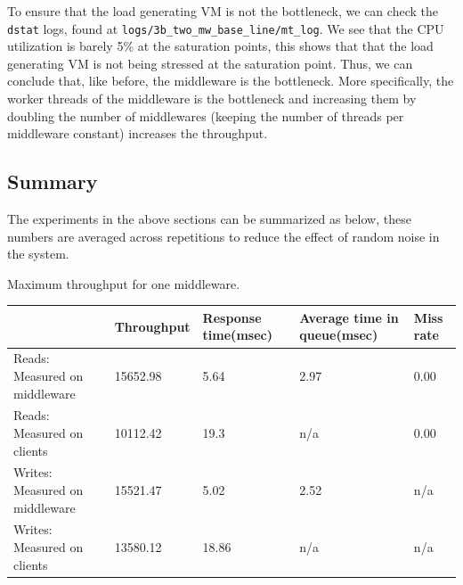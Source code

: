 \documentclass[11pt,a4paper]{article}
\newcommand\instructions[1]{\textcolor{blue}{Instructions: #1}}
\begin{document}
To ensure that the load generating VM is not the bottleneck, we can check the \texttt{dstat} logs, found at \texttt{logs/3b\_two\_mw\_base\_line/mt\_log}. We see that the CPU utilization is barely 5\% at the saturation points, this shows that that the load generating VM is not being stressed at the saturation point. Thus, we can conclude that, like before, the middleware is the bottleneck. More specifically, the worker threads of the middleware is the bottleneck and increasing them by doubling the number of middlewares (keeping the number of threads per middleware constant) increases the throughput.

\subsection{Summary}

The experiments in the above sections can be summarized as below, these numbers are averaged across repetitions to reduce the effect of random noise in the system.


\begin{center}
	{Maximum throughput for one middleware.}
	\begin{tabular}{|l|p{2cm}|p{2cm}|p{2cm}|p{2cm}|}
		\hline                                & Throughput & Response time(msec) & Average time in queue(msec) & Miss rate \\ 
		\hline Reads: Measured on middleware  & 15652.98   & 5.64          & 2.97                  & 0.00      \\ 
		\hline Reads: Measured on clients     & 10112.42   & 19.3          & n/a                   & 0.00      \\ 
		\hline Writes: Measured on middleware & 15521.47   & 5.02	       & 2.52                  & n/a       \\ 
		\hline Writes: Measured on clients    &  13580.12  & 18.86         & n/a                   & n/a       \\ 
		\hline 
	\end{tabular}
\end{center}
\end{document}
